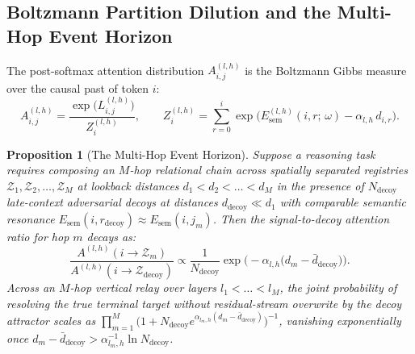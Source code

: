 \documentclass[11pt,letterpaper]{article}
\newtheorem{proposition}[theorem]{Proposition}
\theoremstyle{definition}
\begin{document}
\subsection{Boltzmann Partition Dilution and the Multi-Hop Event Horizon}
The post-softmax attention distribution $A^{(l,h)}_{i,j}$ is the Boltzmann Gibbs measure over the causal past of token $i$:
\begin{equation}
    A^{(l,h)}_{i,j} = \frac{\exp\!\big(L^{(l,h)}_{i,j}\big)}{Z^{(l,h)}_i}, \qquad Z^{(l,h)}_i = \sum_{r=0}^{i} \exp\!\Big(E_{\text{sem}}^{(l,h)}(i, r;\, \omega) - \alpha_{l,h}\, d_{i,r}\Big).
    \label{eq:boltzmann}
\end{equation}

\begin{proposition}[The Multi-Hop Event Horizon]
Suppose a reasoning task requires composing an $M$-hop relational chain across spatially separated registries $\mathcal{Z}_1, \mathcal{Z}_2, \dots, \mathcal{Z}_M$ at lookback distances $d_1 < d_2 < \dots < d_M$ in the presence of $N_{\text{decoy}}$ late-context adversarial decoys at distances $d_{\text{decoy}} \ll d_1$ with comparable semantic resonance $E_{\text{sem}}(i, r_{\text{decoy}}) \approx E_{\text{sem}}(i, j_m)$. Then the signal-to-decoy attention ratio for hop $m$ decays as:
\begin{equation}
    \frac{A^{(l,h)}(i \to \mathcal{Z}_m)}{A^{(l,h)}(i \to \mathcal{Z}_{\text{decoy}})} \propto \frac{1}{N_{\text{decoy}}} \exp\!\Big(-\alpha_{l,h}\big(d_m - \bar{d}_{\text{decoy}}\big)\Big).
\end{equation}
Across an $M$-hop vertical relay over layers $l_1 < \dots < l_M$, the joint probability of resolving the true terminal target without residual-stream overwrite by the decoy attractor scales as $\prod_{m=1}^M \big(1 + N_{\text{decoy}} e^{\alpha_{l_m, h}(d_m - \bar{d}_{\text{decoy}})}\big)^{-1}$, vanishing exponentially once $d_m - \bar{d}_{\text{decoy}} > \alpha_{l_m,h}^{-1} \ln N_{\text{decoy}}$.
\end{proposition}
\end{document}
